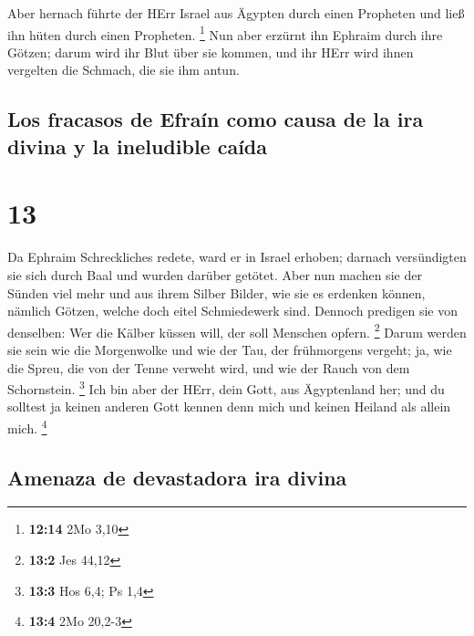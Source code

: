  Aber hernach führte der HErr Israel aus Ägypten durch
einen Propheten und ließ ihn hüten durch einen Propheten. \footnote{\textbf{12:14}
  2Mo 3,10}  Nun aber erzürnt ihn Ephraim durch ihre
Götzen; darum wird ihr Blut über sie kommen, und ihr HErr wird ihnen
vergelten die Schmach, die sie ihm antun.

\hypertarget{los-fracasos-de-efrauxedn-como-causa-de-la-ira-divina-y-la-ineludible-cauxedda}{%
\subsection{Los fracasos de Efraín como causa de la ira divina y la
ineludible
caída}\label{los-fracasos-de-efrauxedn-como-causa-de-la-ira-divina-y-la-ineludible-cauxedda}}

\hypertarget{section-12}{%
\section{13}\label{section-12}}

 Da Ephraim Schreckliches redete, ward er in Israel
erhoben; darnach versündigten sie sich durch Baal und wurden darüber
getötet.  Aber nun machen sie der Sünden viel mehr und aus
ihrem Silber Bilder, wie sie es erdenken können, nämlich Götzen, welche
doch eitel Schmiedewerk sind. Dennoch predigen sie von denselben: Wer
die Kälber küssen will, der soll Menschen opfern. \footnote{\textbf{13:2}
  Jes 44,12}  Darum werden sie sein wie die Morgenwolke
und wie der Tau, der frühmorgens vergeht; ja, wie die Spreu, die von der
Tenne verweht wird, und wie der Rauch von dem Schornstein. \footnote{\textbf{13:3}
  Hos 6,4; Ps 1,4}  Ich bin aber der HErr, dein Gott, aus
Ägyptenland her; und du solltest ja keinen anderen Gott kennen denn mich
und keinen Heiland als allein mich. \footnote{\textbf{13:4} 2Mo 20,2-3}

\hypertarget{amenaza-de-devastadora-ira-divina}{%
\subsection{Amenaza de devastadora ira
divina}\label{amenaza-de-devastadora-ira-divina}}

